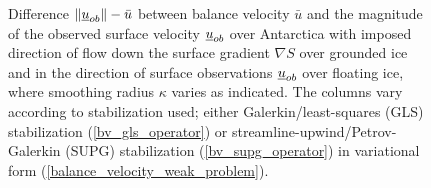 \begin{figure}
  \caption[Antarctica balance-velocity misfit with $\mathbf{d}^{\text{data}} = \mathbf{u}_{ob}$ over shelves.]{Difference $\Vert \underline{u}_{ob} \Vert - \bar{u}$ between balance velocity $\bar{u}$ and the magnitude of the observed surface velocity $\underline{u}_{ob}$ over Antarctica with imposed direction of flow down the surface gradient $\nabla S$ over grounded ice and in the direction of surface observations $\underline{u}_{ob}$ over floating ice, where smoothing radius $\kappa$ varies as indicated.  The columns vary according to  stabilization used; either Galerkin/least-squares (GLS) stabilization (\ref{bv_gls_operator}) or streamline-upwind/Petrov-Galerkin (SUPG) stabilization (\ref{bv_supg_operator}) in variational form (\ref{balance_velocity_weak_problem}). \newline}
  
  \label{antarctica_bv_image_U_ob_S_misfit}

\end{figure}


